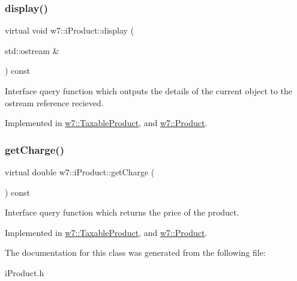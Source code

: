 \subsubsection{\texorpdfstring{display()}{display()}}
{\footnotesize\ttfamily virtual void w7\+::i\+Product\+::display (\begin{DoxyParamCaption}\item[{std\+::ostream \&}]{ }\end{DoxyParamCaption}) const\hspace{0.3cm}{\ttfamily [pure virtual]}}

Interface query function which outputs the details of the current object to the ostream reference recieved. 

Implemented in \mbox{\hyperlink{classw7_1_1TaxableProduct_a57f8cd41d82054c77a7f7f1cf204cc7d}{w7\+::\+Taxable\+Product}}, and \mbox{\hyperlink{classw7_1_1Product_a60b146f19a712d3eadd1b93a48c54e7d}{w7\+::\+Product}}.

\mbox{\label{classw7_1_1iProduct_a4e9fde11cffac0e4309c89d252db89bb}} 
\subsubsection{\texorpdfstring{get\+Charge()}{getCharge()}}
{\footnotesize\ttfamily virtual double w7\+::i\+Product\+::get\+Charge (\begin{DoxyParamCaption}{ }\end{DoxyParamCaption}) const\hspace{0.3cm}{\ttfamily [pure virtual]}}

Interface query function which returns the price of the product. 

Implemented in \mbox{\hyperlink{classw7_1_1TaxableProduct_a3f41864e2a88fa6d847b7fcb704f41f9}{w7\+::\+Taxable\+Product}}, and \mbox{\hyperlink{classw7_1_1Product_a6d73613659451d1492541ef3d0d016b7}{w7\+::\+Product}}.



The documentation for this class was generated from the following file\+:\begin{DoxyCompactItemize}
\item 
i\+Product.\+h\end{DoxyCompactItemize}
